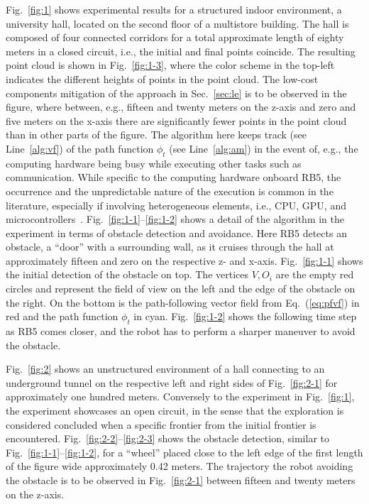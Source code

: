 \documentclass[lettersize,journal]{IEEEtran}
\theoremstyle{definition}
\begin{document}
Fig.~\ref{fig:1} shows experimental results for a structured indoor environment, a university hall, located on the second floor of a multistore building. The hall is composed of four connected corridors for a total approximate length of eighty meters in a closed circuit, i.e., the initial and final points coincide. The resulting point cloud is shown in Fig.~\ref{fig:1-3}, where the color scheme in the top-left indicates the different heights of points in the point cloud. The low-cost components mitigation of the %
approach in Sec.~\ref{sec:le} is to be observed in the figure, where between, e.g., fifteen and twenty meters on the z-axis and zero and five meters on the x-axis there are significantly fewer points in the point cloud than in other parts of the figure. The algorithm here keeps track (see Line~\ref{alg:vf}) of the path function $\phi_t$ (see Line~\ref{alg:am}) in the event of, e.g., the computing hardware being busy while executing other tasks such as communication. While specific to the computing hardware onboard RB5, the occurrence and the unpredictable nature of the execution is common in the literature, especially if involving heterogeneous elements, i.e., CPU, GPU, and microcontrollers~\cite{seewald2019coarse}.
%
Fig.~\ref{fig:1-1}--\ref{fig:1-2} shows a detail of the algorithm in the experiment in terms of obstacle detection and avoidance. Here RB5 detects an obstacle, a ``door'' with a surrounding wall, as it cruises through the hall at approximately fifteen and zero on the respective z- and x-axis. Fig.~\ref{fig:1-1} shows the initial detection of the obstacle on top. The vertices $V, O_i$ are the empty red circles and represent the field of view on the left and the edge of the obstacle on the right. On the bottom is the path-following vector field from Eq.~(\ref{eq:pfvf}) in red and the path function $\phi_t$ in cyan. Fig.~\ref{fig:1-2} shows the following time step as RB5 comes closer, and the robot has to perform a sharper maneuver to avoid the obstacle.

Fig.~\ref{fig:2} shows an unstructured environment of a hall connecting to an underground tunnel on the respective left and right sides of Fig.~\ref{fig:2-1} for approximately one hundred meters. Conversely to the experiment in Fig.~\ref{fig:1}, the experiment showcases an open circuit, in the sense that the exploration is considered concluded when a specific frontier from the initial frontier is encountered. Fig.~\ref{fig:2-2}--\ref{fig:2-3} shows the obstacle detection, similar to Fig.~\ref{fig:1-1}--\ref{fig:1-2}, for a ``wheel'' placed close to the left edge of the first length of the figure wide approximately 0.42 meters. The trajectory the robot avoiding the obstacle is to be observed in Fig.~\ref{fig:2-1} between fifteen and twenty meters on the z-axis.
\end{document}
